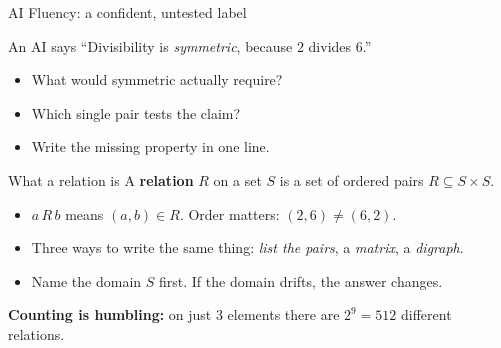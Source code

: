\documentclass[aspectratio=169,10pt]{beamer}
\begin{document}
\begin{frame}{AI Fluency: a confident, untested label}
\begin{block}{An AI says}
``Divisibility is \emph{symmetric}, because $2$ divides $6$.''
\end{block}
\begin{itemize}
\item What would symmetric actually require?
\item Which single pair tests the claim?
\item Write the missing property in one line.
\end{itemize}
\end{frame}

\begin{frame}{What a relation is}
A \textbf{relation} $R$ on a set $S$ is a set of ordered pairs $R \subseteq S\times S$.
\begin{itemize}
\item $a\,R\,b$ means $(a,b)\in R$. Order matters: $(2,6)\neq(6,2)$.
\item Three ways to write the same thing: \emph{list the pairs}, a \emph{matrix}, a \emph{digraph}.
\item Name the domain $S$ first. If the domain drifts, the answer changes.
\end{itemize}
\vspace{4pt}
\textbf{Counting is humbling:} on just 3 elements there are $2^9=512$ different relations.
\end{frame}
\end{document}
